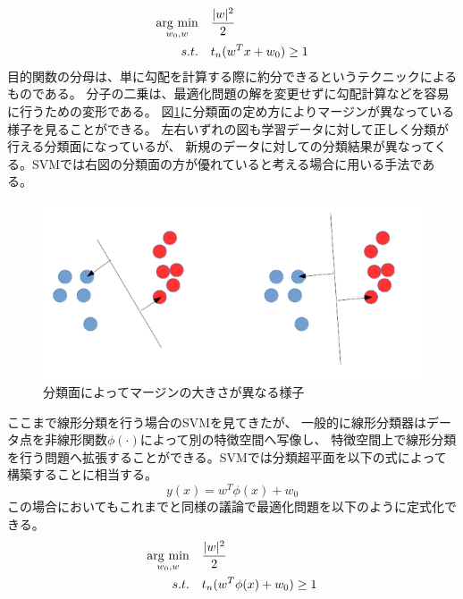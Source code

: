 \begin{align}
     \mathop{\rm arg~min}\limits_{w_0,w} &&& \frac{|w|^2}{2} \nonumber  \\
     s.t. &&& t_n(w^Tx+w_0)  \geq 1 
    \label{eq:obj last margin}
\end{align}
目的関数の分母は、単に勾配を計算する際に約分できるというテクニックによるものである。
分子の二乗は、最適化問題の解を変更せずに勾配計算などを容易に行うための変形である。
図\ref{fig:margin}に分類面の定め方によりマージンが異なっている様子を見ることができる。
左右いずれの図も学習データに対して正しく分類が行える分類面になっているが、
新規のデータに対しての分類結果が異なってくる。SVMでは右図の分類面の方が優れていると考える場合に用いる手法である。
\begin{figure}
    \centering
    \includegraphics[width=12cm]{images/margin.png}
    \caption{分類面によってマージンの大きさが異なる様子}
    \label{fig:margin}
\end{figure}
ここまで線形分類を行う場合のSVMを見てきたが、
一般的に線形分類器はデータ点を非線形関数\(\phi(\cdot)\)によって別の特徴空間へ写像し、
特徴空間上で線形分類を行う問題へ拡張することができる。SVMでは分類超平面を以下の式によって構築することに相当する。
\begin{equation}
    y(x) = w^T \phi (x) + w_0
    \label{eq:displane}
\end{equation}
この場合においてもこれまでと同様の議論で最適化問題を以下のように定式化できる。
\begin{align}
    \mathop{\rm arg~min}\limits_{w_0,w} &&& \frac{|w|^2}{2} \nonumber  \\
    s.t. &&& t_n(w^T\phi(x)+w_0)  \geq 1 
   \label{eq:obj nonlinear}
\end{align}

